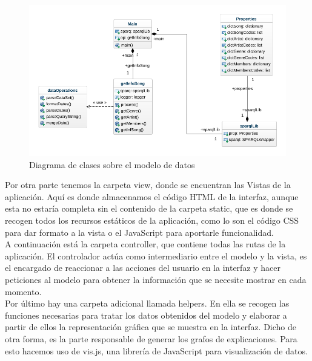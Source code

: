 \begin{figure}[h!]
	\centering
	\includegraphics[width = 1\textwidth]{Imagenes/Bitmap/class-diagram.png}
	\caption{Diagrama de clases sobre el modelo de datos}
	\label{fig:sampleImage}
\end{figure}

Por otra parte tenemos la carpeta view, donde se encuentran las Vistas de la aplicación. Aquí es donde almacenamos el código HTML de la interfaz, aunque esta no estaría completa sin el contenido de la carpeta static, que es donde se recogen todos los recursos estáticos de la aplicación, como lo son el código CSS para dar formato a la vista o el JavaScript para aportarle funcionalidad. \\

A continuación está la carpeta controller, que contiene todas las rutas de la aplicación. El controlador actúa como intermediario entre el modelo y la vista, es el encargado de reaccionar a las acciones del usuario en la interfaz y hacer peticiones al modelo para obtener la información que se necesite mostrar en cada momento. \\

Por último hay una carpeta adicional llamada helpers. En ella se recogen las funciones necesarias para tratar los datos obtenidos del modelo y elaborar a partir de ellos la representación gráfica que se muestra en la interfaz. Dicho de otra forma, es la parte responsable de generar los grafos de explicaciones. Para esto hacemos uso de vis.js, una librería de JavaScript para visualización de datos. \\


